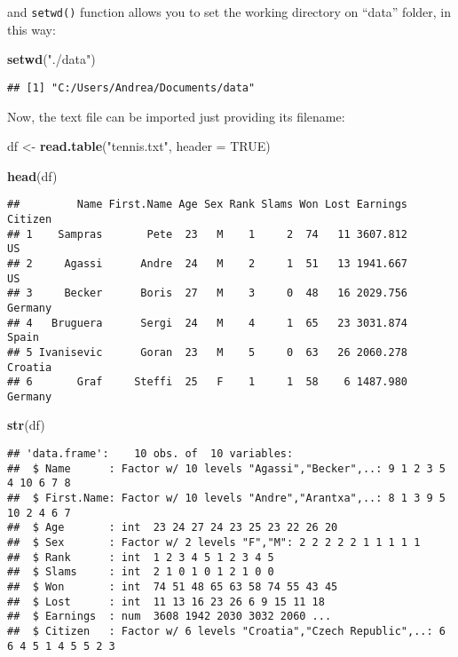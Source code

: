 \documentclass[]{book}
\newenvironment{Shaded}{\begin{snugshade}}{\end{snugshade}}
\newcommand{\KeywordTok}[1]{\textcolor[rgb]{0.13,0.29,0.53}{\textbf{{#1}}}}
\newcommand{\DataTypeTok}[1]{\textcolor[rgb]{0.13,0.29,0.53}{{#1}}}
\newcommand{\StringTok}[1]{\textcolor[rgb]{0.31,0.60,0.02}{{#1}}}
\newcommand{\OtherTok}[1]{\textcolor[rgb]{0.56,0.35,0.01}{{#1}}}
\newcommand{\NormalTok}[1]{{#1}}
\begin{document}
and \texttt{setwd()} function allows you to set the working directory on
``data'' folder, in this way:

\begin{Shaded}
\begin{Highlighting}[]
\KeywordTok{setwd}\NormalTok{(}\StringTok{"./data"}\NormalTok{) }
\end{Highlighting}
\end{Shaded}

\begin{verbatim}
## [1] "C:/Users/Andrea/Documents/data"
\end{verbatim}

Now, the text file can be imported just providing its filename:

\begin{Shaded}
\begin{Highlighting}[]
\NormalTok{df <-}\StringTok{ }\KeywordTok{read.table}\NormalTok{(}\StringTok{"tennis.txt"}\NormalTok{, }\DataTypeTok{header =} \OtherTok{TRUE}\NormalTok{)}
\end{Highlighting}
\end{Shaded}

\begin{Shaded}
\begin{Highlighting}[]
\KeywordTok{head}\NormalTok{(df)}
\end{Highlighting}
\end{Shaded}

\begin{verbatim}
##         Name First.Name Age Sex Rank Slams Won Lost Earnings Citizen
## 1    Sampras       Pete  23   M    1     2  74   11 3607.812      US
## 2     Agassi      Andre  24   M    2     1  51   13 1941.667      US
## 3     Becker      Boris  27   M    3     0  48   16 2029.756 Germany
## 4   Bruguera      Sergi  24   M    4     1  65   23 3031.874   Spain
## 5 Ivanisevic      Goran  23   M    5     0  63   26 2060.278 Croatia
## 6       Graf     Steffi  25   F    1     1  58    6 1487.980 Germany
\end{verbatim}

\begin{Shaded}
\begin{Highlighting}[]
\KeywordTok{str}\NormalTok{(df)}
\end{Highlighting}
\end{Shaded}

\begin{verbatim}
## 'data.frame':    10 obs. of  10 variables:
##  $ Name      : Factor w/ 10 levels "Agassi","Becker",..: 9 1 2 3 5 4 10 6 7 8
##  $ First.Name: Factor w/ 10 levels "Andre","Arantxa",..: 8 1 3 9 5 10 2 4 6 7
##  $ Age       : int  23 24 27 24 23 25 23 22 26 20
##  $ Sex       : Factor w/ 2 levels "F","M": 2 2 2 2 2 1 1 1 1 1
##  $ Rank      : int  1 2 3 4 5 1 2 3 4 5
##  $ Slams     : int  2 1 0 1 0 1 2 1 0 0
##  $ Won       : int  74 51 48 65 63 58 74 55 43 45
##  $ Lost      : int  11 13 16 23 26 6 9 15 11 18
##  $ Earnings  : num  3608 1942 2030 3032 2060 ...
##  $ Citizen   : Factor w/ 6 levels "Croatia","Czech Republic",..: 6 6 4 5 1 4 5 5 2 3
\end{verbatim}
\end{document}
